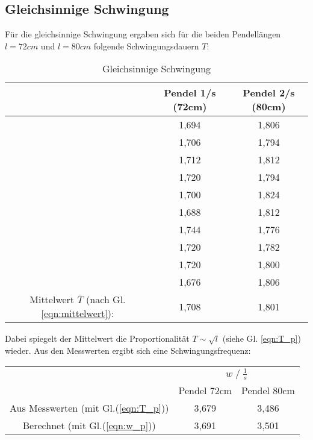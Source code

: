 \subsection{Gleichsinnige Schwingung}
Für die gleichsinnige Schwingung ergaben sich für die beiden Pendellängen $l=72cm$ und $l=80cm$
folgende Schwingungsdauern $T$:
\begin{table}
    \centering
    \label{tab:Data_gleichphasig}
    \begin{tabular}{c c | c}
        \toprule
        & Pendel 1\;/\;s (72cm) & Pendel 2\;/\;s (80cm)\\
        \midrule
            & 1,694 & 1,806 \\
            & 1,706 & 1,794 \\
            & 1,712 & 1,812 \\
            & 1,720 & 1,794 \\
            & 1,700 & 1,824 \\
            & 1,688 & 1,812 \\
            & 1,744 & 1,776 \\
            & 1,720 & 1,782 \\
            & 1,720 & 1,800 \\
            & 1,676 & 1,806 \\        
        \midrule
        Mittelwert $\bar{T}$ (nach Gl. \ref{eqn:mittelwert}): & 1,708 & 1,801 \\
        \bottomrule
    \end{tabular}
    \caption{Gleichsinnige Schwingung}
\end{table}

Dabei spiegelt der Mittelwert die Proportionalität $T \sim \sqrt{l}$ (siehe Gl. \ref{eqn:T_p}) wieder.\newline
Aus den Messwerten ergibt sich eine Schwingungsfrequenz:
\begin{table}
    \centering
    \label{tab:frq_gleichs}
    \begin{tabular}{c c c}
        \toprule
        & \multicolumn{2}{c}{$w\;/\;\frac{1}{s}$}\\
        \cmidrule(lr){2-3} 
        & Pendel 72cm & Pendel 80cm\\
        \midrule
        Aus Messwerten (mit Gl.(\ref{eqn:T_p})) & 3,679 & 3,486 \\
        Berechnet (mit Gl.(\ref{eqn:w_p}))      & 3,691 & 3,501 \\
        \bottomrule
    \end{tabular}
\end{table}
\newpage

